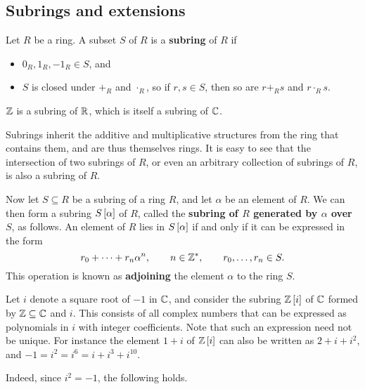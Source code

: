 \subsection{Subrings and extensions}

\begin{definition}
Let $ R $ be a ring. A subset $ S $ of $ R $ is a \textbf{subring} of $ R $ if
\begin{itemize}
\item $ 0_R, 1_R, -1_R \in S $, and
\item $ S $ is closed under $ +_R $ and $ \cdot_R $, so if $ r, s \in S $, then so are $ r +_R s $ and $ r \cdot_R s $.
\end{itemize}
\end{definition}

\begin{example2}
$ \Z $ is a subring of $ \R $, which is itself a subring of $ \C $.
\end{example2}

Subrings inherit the additive and multiplicative structures from the ring that contains them, and are thus themselves rings. It is easy to see that the intersection of two subrings of $ R $, or even an arbitrary collection of subrings of $ R $, is also a subring of $ R $.

\begin{definition}
Now let $ S \subseteq R $ be a subring of a ring $ R $, and let $ \alpha $ be an element of $ R $. We can then form a subring $ S\sb{\alpha} $ of $ R $, called the \textbf{subring of $ R $ generated by $ \alpha $ over $ S $}, as follows. An element of $ R $ lies in $ S\sb{\alpha} $ if and only if it can be expressed in the form
$$ r_0 + \dots + r_n\alpha^n, \qquad n \in \Z^*, \qquad r_0, \dots, r_n \in S. $$
This operation is known as \textbf{adjoining} the element $ \alpha $ to the ring $ S $.
\end{definition}

\begin{example2}
Let $ i $ denote a square root of $ -1 $ in $ \C $, and consider the subring $ \Z\sb{i} $ of $ \C $ formed by $ \Z \subseteq \C $ and $ i $. This consists of all complex numbers that can be expressed as polynomials in $ i $ with integer coefficients. Note that such an expression need not be unique. For instance the element $ 1 + i $ of $ \Z\sb{i} $ can also be written as $ 2 + i + i^2 $, and $ -1 = i^2 = i^6 = i + i^3 + i^{10} $.
\end{example2}

Indeed, since $ i^2 = -1 $, the following holds.


